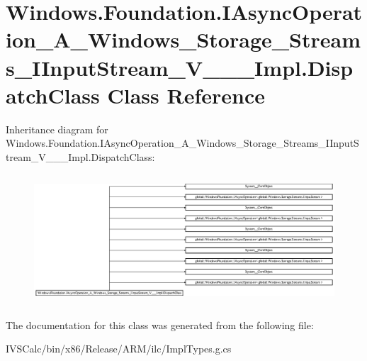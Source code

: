 \hypertarget{class_windows_1_1_foundation_1_1_i_async_operation___a___windows___storage___streams___i_input_s4e981d0855e558835cb93796a4c93e21}{}\section{Windows.\+Foundation.\+I\+Async\+Operation\+\_\+\+A\+\_\+\+Windows\+\_\+\+Storage\+\_\+\+Streams\+\_\+\+I\+Input\+Stream\+\_\+\+V\+\_\+\+\_\+\+\_\+\+Impl.\+Dispatch\+Class Class Reference}
\label{class_windows_1_1_foundation_1_1_i_async_operation___a___windows___storage___streams___i_input_s4e981d0855e558835cb93796a4c93e21}
Inheritance diagram for Windows.\+Foundation.\+I\+Async\+Operation\+\_\+\+A\+\_\+\+Windows\+\_\+\+Storage\+\_\+\+Streams\+\_\+\+I\+Input\+Stream\+\_\+\+V\+\_\+\+\_\+\+\_\+\+Impl.\+Dispatch\+Class\+:\begin{figure}[H]
\begin{center}
\leavevmode
\includegraphics[height=4.881141cm]{class_windows_1_1_foundation_1_1_i_async_operation___a___windows___storage___streams___i_input_s4e981d0855e558835cb93796a4c93e21}
\end{center}
\end{figure}


The documentation for this class was generated from the following file\+:\begin{DoxyCompactItemize}
\item 
I\+V\+S\+Calc/bin/x86/\+Release/\+A\+R\+M/ilc/Impl\+Types.\+g.\+cs\end{DoxyCompactItemize}
